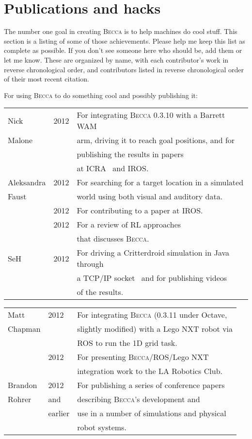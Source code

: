 \chapter{Publications and hacks}

The number one goal in creating \textsc{Becca} is to help machines do cool stuff. This section is a listing of some of those achievements. Please help me keep this list as complete as possible. If you don't see someone here who should be, add them or let me know. These are organized by name, with each contributor's work in reverse chronological order, and contributors listed in reverse chronological order of their most recent citation.

For using \textsc{Becca} to do something cool and possibly publishing it:

\begin{tabular}{|l|l|l|}
\hline
Nick &2012& For integrating \textsc{Becca} 0.3.10 with a Barrett WAM\\
Malone&& arm, driving it to reach goal positions, and for \\
 && publishing the results in papers \\
 && at ICRA~\cite{malone12b} and IROS.~\cite{malone12a}\\
\hline
Aleksandra & 2012 & For searching for a target location in a simulated\\
Faust&& world using both visual and auditory data.\\
&2012& For contributing to a paper at IROS.~\cite{malone12a}\\
&2012& For a review of RL approaches \\
&&that discusses \textsc{Becca}.~\cite{faust12}\\
\hline
SeH & 2012 & For driving a Critterdroid simulation in Java through \\
&&a TCP/IP socket~\cite{seh12a} and for publishing videos \\
&&of the results.~\cite{seh12b,seh12c,seh12d,seh12e} \\
\hline
 \end{tabular}

\begin{tabular}{|l|l|l|}
\hline
Matt & 2012 & For integrating \textsc{Becca} (0.3.11 under Octave,\\
Chapman&& slightly modified) with a Lego NXT robot via \\
&&ROS to run the 1D grid task.~\cite{chapman12a}\\
& 2012 & For presenting \textsc{Becca}/ROS/Lego NXT \\
&&integration work to the LA Robotics Club.~\cite{chapman12b}\\
\hline
Brandon & 2012 & For publishing a series of conference papers  \\
Rohrer & and & describing \textsc{Becca}'s development and \\
& earlier & use in a number of simulations and physical \\
&& robot systems.\\
\hline
\end{tabular}


